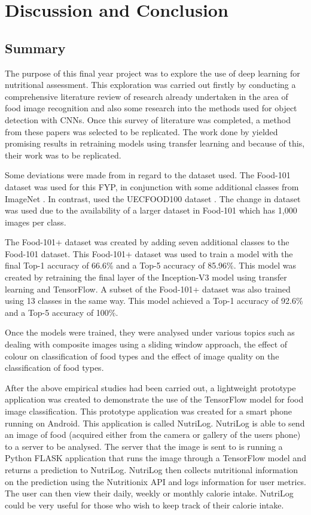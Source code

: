 \chapter{Discussion and Conclusion}
\section{Summary}
The purpose of this final year project was to explore the use of deep learning for nutritional assessment.
This exploration was carried out firstly by conducting a comprehensive literature review of research already undertaken in the area of food image recognition and also some research into the methods used for object detection with CNNs.
Once this survey of literature was completed, a method from these papers was selected to be replicated.
The work done by \parencite{yanaiFood} yielded promising results in retraining models using transfer learning and because of this, their work was to be replicated.

Some deviations were made from \parencite{yanaiFood} in regard to the dataset used.
The Food-101 dataset was used for this FYP, in conjunction with some additional classes from ImageNet \parencite{imagenet}.
In contrast, \parencite{yanaiFood} used the UECFOOD100 dataset \parencite{uecFood}.
The change in dataset was used due to the availability of a larger dataset in Food-101 which has 1,000 images per class.

The Food-101+ dataset was created by adding seven additional classes to the Food-101 dataset.
This Food-101+ dataset was used to train a model with the final Top-1 accuracy of 66.6\% and a Top-5 accuracy of  85.96\%.
This model was created by retraining the final layer of the Inception-V3 \parencite{rethinkingInception} model using transfer learning and TensorFlow.
A subset of the Food-101+ dataset was also trained using 13 classes in the same way.
This model achieved a Top-1 accuracy of 92.6\% and a Top-5 accuracy of 100\%.

Once the models were trained, they were analysed under various topics such as
dealing with composite images using a sliding window approach, the effect of colour on classification of food types and the effect of image quality on the classification of food types.

After the above empirical studies had been carried out, a lightweight prototype application was created to demonstrate the use of the TensorFlow model for food image classification.
This prototype application was created for a smart phone running on Android.
This application is called NutriLog.
NutriLog is able to send an image of food (acquired either from the camera or gallery of the users phone) to a server to be analysed.
The server that the image is sent to is running a Python FLASK application that runs the image through a TensorFlow model and returns a prediction to NutriLog.
NutriLog then collects nutritional information on the prediction using the Nutritionix API and logs information for user metrics.
The user can then view their daily, weekly or monthly calorie intake.
NutriLog could be very useful for those who wish to keep track of their calorie intake.

